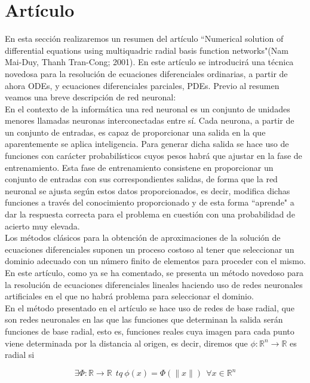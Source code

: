 \documentclass[12pt]{article}       %
\begin{document}
\section{Artículo}

En esta sección realizaremos un resumen del artículo ``Numerical solution of differential equations using multiquadric radial basis function networks"(Nam Mai-Duy, Thanh Tran-Cong; 2001). En este artículo se introducirá una técnica novedosa para la resolución de ecuaciones diferenciales ordinarias, a partir de ahora ODEs, y ecuaciones diferenciales parciales, PDEs. Previo al resumen veamos una breve descripción de red neuronal:\\

En el contexto de la informática una red neuronal es un conjunto de unidades menores llamadas neuronas interconectadas entre sí. Cada neurona, a partir de un conjunto de entradas, es capaz de proporcionar una salida en la que aparentemente se aplica inteligencia. Para generar dicha salida se hace uso de funciones con carácter probabilísticos cuyos pesos habrá que ajustar en la fase de entrenamiento. Esta fase de entrenamiento consistene en proporcionar un conjunto de entradas con sus correspondientes salidas, de forma que la red neuronal se ajusta según estos datos proporcionados, es decir, modifica dichas funciones a través del conocimiento proporcionado y de esta forma ``aprende" a dar la respuesta correcta para el problema en cuestión con una probabilidad de acierto muy elevada.\\

Los métodos clásicos para la obtención de aproximaciones de la solución de ecuaciones diferenciales suponen un proceso costoso al tener que seleccionar un dominio adecuado con un número finito de elementos para proceder con el mismo. En este artículo, como ya se ha comentado, se presenta un método novedoso para la resolución de ecuaciones diferenciales lineales haciendo uso de redes neuronales artificiales en el que no habrá problema para seleccionar el dominio. \\

En el método presentado en el artículo se hace uso de redes de base radial, que son redes neuronales en las que las funciones que determinan la salida serán funciones de base radial, esto es, funciones reales cuya imagen para cada punto viene determinada por la distancia al origen, es decir, diremos que $\phi:\mathbb{R}^n\to \mathbb{R} $  es radial si

$$\exists \Phi:\mathbb{R}\to \mathbb{R}\ \ tq\ \phi(x)=\Phi(\parallel x\parallel)\ \ \forall x\in\mathbb{R}^n$$
\end{document}
